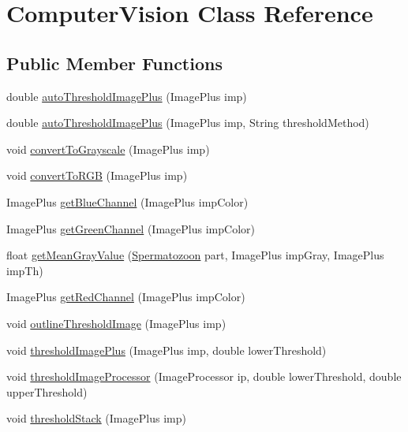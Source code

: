 \hypertarget{classfunctions_1_1_computer_vision}{}\section{Computer\+Vision Class Reference}
\label{classfunctions_1_1_computer_vision}
\subsection*{Public Member Functions}
\begin{DoxyCompactItemize}
\item 
double \hyperlink{classfunctions_1_1_computer_vision_a93e3c71f7e9e359a377ebed559810c28}{auto\+Threshold\+Image\+Plus} (Image\+Plus imp)
\item 
double \hyperlink{classfunctions_1_1_computer_vision_a682b3978d10477ebaf0c32969ff6650b}{auto\+Threshold\+Image\+Plus} (Image\+Plus imp, String threshold\+Method)
\item 
void \hyperlink{classfunctions_1_1_computer_vision_a4d0fe516e9ef71c60ba67150cf288030}{convert\+To\+Grayscale} (Image\+Plus imp)
\item 
void \hyperlink{classfunctions_1_1_computer_vision_a98a9ec9a4b8c6a28678d649822a73bc8}{convert\+To\+R\+GB} (Image\+Plus imp)
\item 
Image\+Plus \hyperlink{classfunctions_1_1_computer_vision_a8569abc8aa379c890c8332eda42095be}{get\+Blue\+Channel} (Image\+Plus imp\+Color)
\item 
Image\+Plus \hyperlink{classfunctions_1_1_computer_vision_a42b101d8bd6c2d64f663411074910dde}{get\+Green\+Channel} (Image\+Plus imp\+Color)
\item 
float \hyperlink{classfunctions_1_1_computer_vision_af9a3285b7e044506df25989c9f718308}{get\+Mean\+Gray\+Value} (\hyperlink{classdata_1_1_spermatozoon}{Spermatozoon} part, Image\+Plus imp\+Gray, Image\+Plus imp\+Th)
\item 
Image\+Plus \hyperlink{classfunctions_1_1_computer_vision_a0a2c9c7e45231d1d09b3c8aca3df6511}{get\+Red\+Channel} (Image\+Plus imp\+Color)
\item 
void \hyperlink{classfunctions_1_1_computer_vision_a1272b47ed42c25a4d2d7f7d891d0e42f}{outline\+Threshold\+Image} (Image\+Plus imp)
\item 
void \hyperlink{classfunctions_1_1_computer_vision_a75c4bdce2977d9dcfe309e60b16cbf4f}{threshold\+Image\+Plus} (Image\+Plus imp, double lower\+Threshold)
\item 
void \hyperlink{classfunctions_1_1_computer_vision_ae1ef4c4258127cb97bae706e7f65fc2e}{threshold\+Image\+Processor} (Image\+Processor ip, double lower\+Threshold, double upper\+Threshold)
\item 
void \hyperlink{classfunctions_1_1_computer_vision_a253912ee71e289051b50b08dcce6376f}{threshold\+Stack} (Image\+Plus imp)
\end{DoxyCompactItemize}


